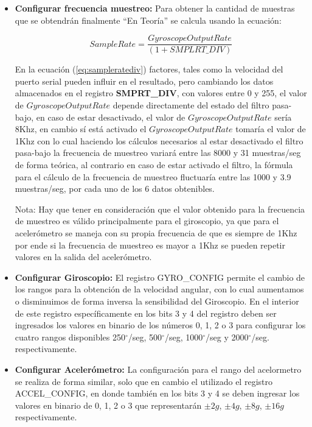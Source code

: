 \documentclass[12pt,a4paper]{article}
\newcommand{\grad}{$^{\circ}$}
\begin{document}
\begin{itemize}
	\item \textbf{Configurar frecuencia muestreo:} Para obtener la cantidad de muestras que se obtendrán finalmente ``En Teoría'' se calcula usando la ecuación: 
	
	\begin{equation} 
		\label{eq:sampleratediv}
		Sample Rate = \frac{Gyroscope Output Rate}{(1 + SMPLRT\_DIV) }
	\end{equation}
	
	En la ecuación (\ref{eq:sampleratediv}) factores, tales como la velocidad del puerto serial pueden influir en el resultado, pero cambiando los datos almacenados en el registro \textbf{SMPRT\_DIV}, con valores entre 0 y 255, el valor de $Gyroscope Output Rate$ depende directamente del estado del filtro pasa-bajo, en caso de estar desactivado, el valor de $Gyroscope Output Rate$ sería 8Khz, en cambio sí está activado el $Gyroscope Output Rate$ tomaría el valor de 1Khz con lo cual haciendo los cálculos necesarios al estar desactivado el filtro pasa-bajo la frecuencia de muestreo variará entre las 8000 y 31 muestras/seg de forma teórica, al contrario en caso de estar activado el filtro, la fórmula para el cálculo de la frecuencia de muestreo fluctuaría entre las 1000 y 3.9 muestras/seg, por cada uno de los 6 datos obtenibles.
	
	Nota: Hay que tener en consideración que el valor obtenido para la frecuencia de muestreo es válido principalmente para el giroscopio, ya que para el acelerómetro se maneja con su propia frecuencia de que es siempre de 1Khz por ende si la frecuencia de muestreo es mayor a 1Khz se pueden repetir valores en la salida del acelerómetro.
	
	\item \textbf{Configurar Giroscopio:} El registro GYRO\_CONFIG permite el cambio de los rangos para la obtención de la velocidad angular, con lo cual aumentamos o disminuimos de forma inversa la sensibilidad del Giroscopio. En el interior de este registro específicamente en los bits 3 y 4 del registro deben ser ingresados los valores en binario de los números 0, 1, 2 o 3 para configurar los cuatro rangos disponibles 250\grad/seg, 500\grad/seg, 1000\grad/seg y 2000\grad/seg. respectivamente.
	
	\item \textbf{Configurar Acelerómetro:} La configuración para el rango del acelormetro se realiza de forma similar, solo que en cambio el utilizado el registro ACCEL\_CONFIG, en donde también en los bits 3 y 4 se deben ingresar los valores en binario de 0, 1, 2 o 3 que representarán $\pm 2g$, $\pm 4g$, $\pm 8g$, $\pm 16g$ respectivamente.
	
\end{itemize}
\end{document}
